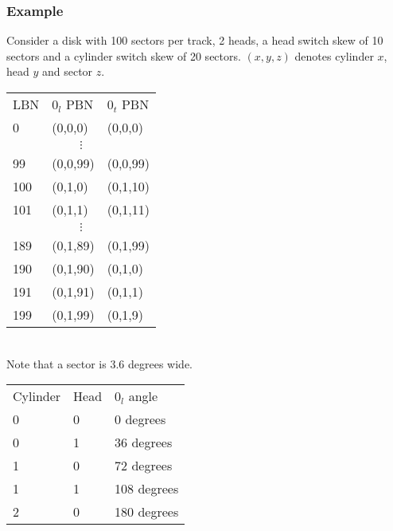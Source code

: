 \subsubsection{Example}

Consider a disk with 100 sectors per track, 2 heads, a head switch
skew of 10 sectors and a cylinder switch skew of 20 sectors. $(x,y,z)$
denotes cylinder $x$, head $y$ and sector $z$.\\

\begin{tabular}{l|l|l}
LBN & $0_l$ PBN & $0_t$ PBN \\
\cline{1-3}
0 & (0,0,0) & (0,0,0) \\
\multicolumn{3}{c}{$\vdots$} \\
99 & (0,0,99) & (0,0,99) \\
100 &  (0,1,0) & (0,1,10) \\
101 &  (0,1,1) & (0,1,11) \\
\multicolumn{3}{c}{$\vdots$} \\
189 & (0,1,89) & (0,1,99) \\
190 & (0,1,90) & (0,1,0) \\
191 & (0,1,91) & (0,1,1) \\
199 & (0,1,99) & (0,1,9) \\
\end{tabular}\\

Note that a sector is $3.6$ degrees wide.\\

\begin{tabular}{l|l|l}
Cylinder & Head & $0_l$ angle \\
\cline{1-3}
0 & 0 & 0 degrees \\
0 & 1 & 36 degrees \\
1 & 0 & 72 degrees \\
1 & 1 & 108 degrees \\
2 & 0 & 180 degrees \\
\end{tabular}
